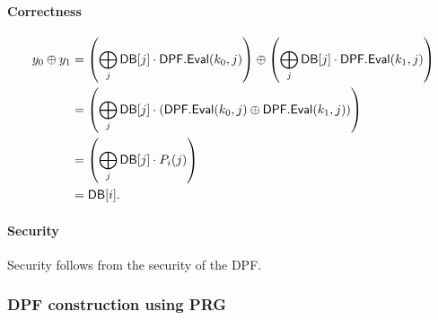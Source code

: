 \paragraph{Correctness} 
\begin{align*} 
    y_0 \oplus y_1 & = \left(\bigoplus_{j}{\sf DB}[j]\cdot {\sf DPF.Eval}(k_0,j) \right) \oplus \left(\bigoplus_{j}\mathsf{DB}[j]\cdot {\sf DPF}.{\sf Eval}(k_1,j) \right) \\
    & = \left(\bigoplus_{j}{\sf DB}[j]\cdot ({\sf DPF.Eval}(k_0,j)\oplus {\sf DPF}.{\sf Eval}(k_1,j)) \right) \\
    & = \left(\bigoplus_{j}{\sf DB}[j]\cdot P_{i}(j)\right) \\
    & = {\sf DB}[i].
\end{align*}
\paragraph{Security}
Security follows from the security of the DPF.



\subsubsection{DPF construction using PRG}



